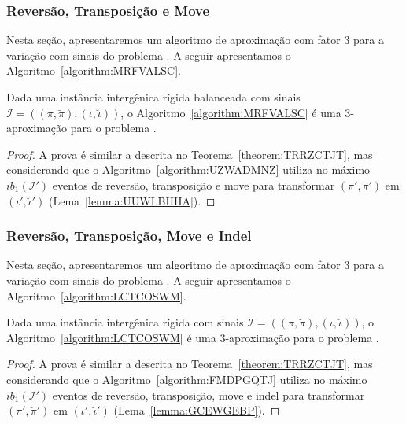 \subsubsection{Reversão, Transposição e Move}

Nesta seção, apresentaremos um algoritmo de aproximação com fator $3$ para a variação com sinais do problema \SbIRTM{}. A seguir apresentamos o Algoritmo~\ref{algorithm:MRFVALSC}.



\begin{theorem}\label{theorem:SIMBVUPO}
Dada uma instância intergênica rígida balanceada com sinais $\mathcal{I}=((\pi,\breve\pi),(\iota,\breve\iota))$, o Algoritmo~\ref{algorithm:MRFVALSC} é uma $3$-aproximação para o problema \SbIRTM{}.
\end{theorem}
\begin{proof}
A prova é similar a descrita no Teorema~\ref{theorem:TRRZCTJT}, mas considerando que o Algoritmo~\ref{algorithm:UZWADMNZ} utiliza no máximo $ib_1(\mathcal{I'})$ eventos de reversão, transposição e move para transformar $(\pi',\breve\pi')$ em $(\iota',\breve\iota')$ (Lema~\ref{lemma:UUWLBHHA}).
\end{proof}

\subsubsection{Reversão, Transposição, Move e Indel}

Nesta seção, apresentaremos um algoritmo de aproximação com fator $3$ para a variação com sinais do problema \SbIRTMI{}. A seguir apresentamos o Algoritmo~\ref{algorithm:LCTCOSWM}.



\begin{theorem}\label{theorem:KKKBVPAY}
Dada uma instância intergênica rígida com sinais $\mathcal{I}=((\pi,\breve\pi),(\iota,\breve\iota))$, o Algoritmo~\ref{algorithm:LCTCOSWM} é uma $3$-aproximação para o problema \SbIRTMI{}.
\end{theorem}
\begin{proof}
A prova é similar a descrita no Teorema~\ref{theorem:TRRZCTJT}, mas considerando que o Algoritmo~\ref{algorithm:FMDPGQTJ} utiliza no máximo $ib_1(\mathcal{I'})$ eventos de reversão, transposição, move e indel para transformar $(\pi',\breve\pi')$ em $(\iota',\breve\iota')$ (Lema~\ref{lemma:GCEWGEBP}).
\end{proof}


